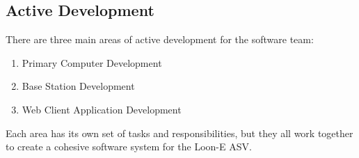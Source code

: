 %
%
%
%


\subsection{Active Development}
\label{sec:active-development}

There are three main areas of active development for the software team: 

\begin{enumerate}
    \item Primary Computer Development
    \item Base Station Development
    \item Web Client Application Development
\end{enumerate}

Each area has its own set of tasks and responsibilities, but they all work together to create a cohesive software system for the Loon-E ASV.

